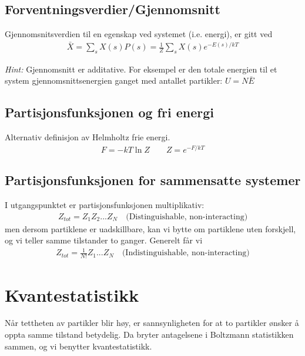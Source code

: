 \documentclass[10pt,a4paper]{article}
\renewcommand{\exp}{e^}
\renewcommand{\i}{\textit}
\begin{document}
\begin{multicols}{2}
\subsection*{Forventningsverdier/Gjennomsnitt}
\begin{framed}
Gjennomsnitsverdien til en egenskap ved systemet (i.e. energi), er gitt ved
\begin{align*}
	\bar{X} = \sum\limits_s X(s) P(s) = \frac{1}{Z} \sum\limits_s X(s)\exp{-E(s)/kT}
\end{align*}

\i{Hint:} Gjennomsnitt er additative. For eksempel er den totale energien til et system gjennomsnittsenergien ganget med antallet partikler: $U = N\bar{E}$
\end{framed}

\subsection*{Partisjonsfunksjonen og fri energi}
Alternativ definisjon av Helmholtz frie energi.
\begin{align*}
	F = -kT\ln{Z} \quad \quad Z = \exp{-F/kT}
\end{align*}


\subsection*{Partisjonsfunksjonen for sammensatte systemer}
\begin{framed}
I utgangspunktet er partisjonsfunksjonen multiplikativ:
\begin{align*}
	Z_{tot} = Z_1Z_2...Z_N \quad \text{(Distinguishable, non-interacting)}
\end{align*}
men dersom partiklene er uadskillbare, kan vi bytte om partiklene uten forskjell, og vi teller samme tilstander to ganger. Generelt får vi
\begin{align*}
	Z_{tot} = \frac{1}{N!}Z_1...Z_N \quad \text{(Indistinguishable, non-interacting)}
\end{align*}
\end{framed}




\section{Kvantestatistikk}
Når tettheten av partikler blir høy, er sannsynligheten for at to partikler ønsker å oppta samme tilstand betydelig. Da bryter antagelsene i Boltzmann statistikken sammen, og vi benytter kvantestatistikk.



\end{multicols}
\end{document}
